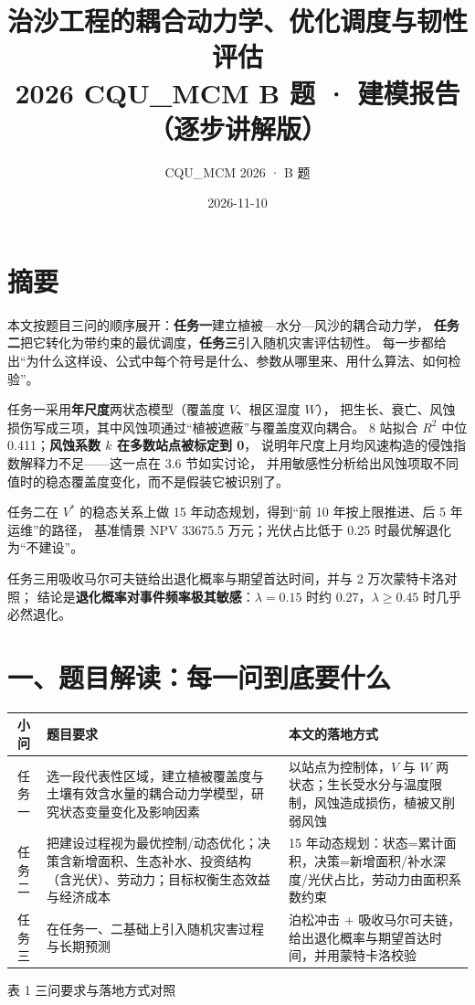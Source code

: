 \documentclass[11pt,a4paper]{ctexart}
\title{治沙工程的耦合动力学、优化调度与韧性评估\\[2pt]
\large 2026 CQU\_MCM B 题 · 建模报告（逐步讲解版）}
\author{CQU\_MCM 2026 · B 题}
\date{2026-11-10}
\begin{document}
\maketitle
\thispagestyle{empty}
\newpage

\section*{摘\quad 要}
本文按题目三问的顺序展开：\textbf{任务一}建立植被—水分—风沙的耦合动力学，
\textbf{任务二}把它转化为带约束的最优调度，\textbf{任务三}引入随机灾害评估韧性。
每一步都给出“为什么这样设、公式中每个符号是什么、参数从哪里来、用什么算法、如何检验”。

任务一采用\textbf{年尺度}两状态模型（覆盖度 $V$、根区湿度 $W$），
把生长、衰亡、风蚀损伤写成三项，其中风蚀项通过“植被遮蔽”与覆盖度双向耦合。
8 站拟合 $R^2$ 中位 0.411；\textbf{风蚀系数 $k$ 在多数站点被标定到 0}，
说明年尺度上月均风速构造的侵蚀指数解释力不足——这一点在 3.6 节如实讨论，
并用敏感性分析给出风蚀项取不同值时的稳态覆盖度变化，而不是假装它被识别了。

任务二在 ${V^*}$ 的稳态关系上做 15 年动态规划，得到“前 10 年按上限推进、后 5 年运维”的路径，
基准情景 NPV 33675.5 万元；光伏占比低于 0.25 时最优解退化为“不建设”。

任务三用吸收马尔可夫链给出退化概率与期望首达时间，并与 2 万次蒙特卡洛对照；
结论是\textbf{退化概率对事件频率极其敏感}：$\lambda=0.15$ 时约 0.27，$\lambda\ge0.45$ 时几乎必然退化。

\section*{一、题目解读：每一问到底要什么}
\begin{table}[H]\centering\footnotesize\setlength{\parskip}{1pt}
\begin{tabularx}{\textwidth}{|c|X|X|}
\toprule
小问 & 题目要求 & 本文的落地方式 \\
\midrule
任务一 & 选一段代表性区域，建立植被覆盖度与土壤有效含水量的耦合动力学模型，研究状态变量变化及影响因素
 & 以站点为控制体，$V$ 与 $W$ 两状态；生长受水分与温度限制，风蚀造成损伤，植被又削弱风蚀 \\
任务二 & 把建设过程视为最优控制/动态优化；决策含新增面积、生态补水、投资结构（含光伏）、劳动力；目标权衡生态效益与经济成本
 & 15 年动态规划：状态=累计面积，决策=新增面积/补水深度/光伏占比，劳动力由面积系数约束 \\
任务三 & 在任务一、二基础上引入随机灾害过程与长期预测
 & 泊松冲击 + 吸收马尔可夫链，给出退化概率与期望首达时间，并用蒙特卡洛校验 \\
\bottomrule
\end{tabularx}
\begin{center}\small 表 1  三问要求与落地方式对照\end{center}
\end{table}
\end{document}
